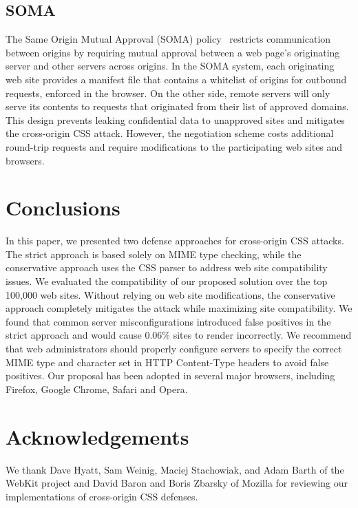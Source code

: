 \documentclass{acm_proc_article-sp}
\begin{document}
\subsection{SOMA}
The Same Origin Mutual Approval (SOMA) policy~\cite{soma} restricts communication between origins by requiring mutual approval between a web page's originating server and other servers across origins. In the SOMA system, each originating web site provides a manifest file that contains a whitelist of origins for outbound requests, enforced in the browser. On the other side, remote servers will only serve its contents to requests that originated from their list of approved domains. This design prevents leaking confidential data to unapproved sites and mitigates the cross-origin CSS attack. However, the negotiation scheme costs additional round-trip requests and require modifications to the participating web sites and browsers.

\section{Conclusions} \label{sec:conclusion}
In this paper, we presented two defense approaches for cross-origin CSS attacks. The strict approach is based solely on MIME type
checking, while the conservative approach uses the CSS parser to
address web site compatibility issues. We evaluated the compatibility of our
proposed solution over the top 100,000 web sites. Without relying on web site
modifications, the conservative approach completely mitigates the attack while
maximizing site compatibility. We found that common server misconfigurations
introduced false positives in the strict approach and would cause 0.06\%
sites to render incorrectly. We recommend that web administrators should
properly configure servers to specify the correct MIME type and character set in HTTP Content-Type headers to avoid false
positives. Our proposal has been adopted in several major browsers, including
Firefox, Google Chrome, Safari and Opera.

\section*{Acknowledgements}

We thank Dave Hyatt, Sam Weinig, Maciej Stachowiak, and Adam Barth of the
WebKit project and David Baron and Boris Zbarsky of Mozilla for reviewing our implementations of cross-origin CSS defenses.



\end{document}
